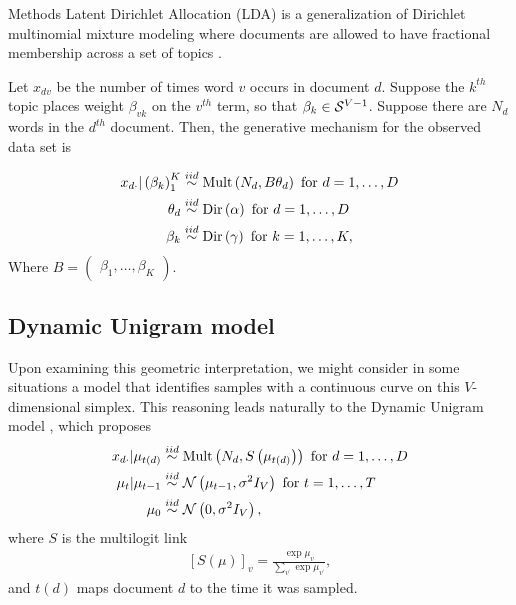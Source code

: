 \documentclass[final]{beamer}
\newlength{\onecolwid}
\begin{document}
\begin{frame}
\begin{columns}
\begin{column}{\onecolwid}
\begin{block}{Methods}
Latent Dirichlet Allocation (LDA) is a generalization of Dirichlet multinomial
mixture modeling where documents are allowed to have fractional membership
across a set of topics \citep{blei2003latent}.

Let $x_{dv}$ be the number of times word $v$ occurs in document $d$. Suppose the
$k^{th}$ topic places weight $\beta_{vk}$ on the $v^{th}$ term, so that
$\beta_{k} \in \mathcal{S}^{V - 1}$. Suppose there are $N_{d}$ words in the
$d^{th}$ document. Then, the generative mechanism for the observed data set is

\begin{align*}
x_{d\cdot} \vert \left(\beta_{k}\right)_{1}^{K} &\overset{iid}{\sim} \textnormal{Mult}\left(N_{d}, B\theta_{d}\right) \text{ for } d = 1, \dots, D\\
\theta_{d} &\overset{iid}{\sim} \textnormal{Dir}\left(\alpha\right) \text{ for } d = 1, \dots, D \\
\beta_{k} &\overset{iid}{\sim} \textnormal{Dir}\left(\gamma\right) \text{ for }k = 1, \dots, K,
\end{align*}
Where $B = \begin{pmatrix}\beta_{1}, \dots, \beta_{K}\end{pmatrix}$.

\subsection{Dynamic Unigram model}
\label{subsec:dynamic_unigram_model}

Upon examining this geometric interpretation, we might consider in some
situations a model that identifies samples with a continuous curve on this
$V$-dimensional simplex. This reasoning leads naturally to the Dynamic
Unigram model \citep{blei2006dynamic}, which proposes
\begin{align*}
x_{d\cdot} \vert \mu_{t\left(d\right)}  &\overset{iid}{\sim} \textnormal{Mult}\left(N_{d}, S\left(\mu_{t\left(d\right)}\right)\right) \text{ for } d = 1, \dots, D\\
\mu_{t} \vert \mu_{t - 1} &\overset{iid}{\sim} \mathcal{N}\left(\mu_{t - 1}, \sigma^{2}I_{V}\right) \text{ for } t = 1, \dots, T \\
\mu_{0} &\overset{iid}{\sim} \mathcal{N}\left(0, \sigma^{2}I_{V}\right),
\end{align*}
where $S$ is the multilogit link
\begin{align*}
\left[S\left(\mu\right)\right]_{v} = \frac{\exp{\mu_{v}}}{\sum_{v^{\prime}} \exp{\mu_{v^{\prime}}}},
\end{align*}
and $t\left(d\right)$ maps document $d$ to the time it was sampled.
\end{block}


\end{column}
\end{columns}
\end{frame}
\end{document}
